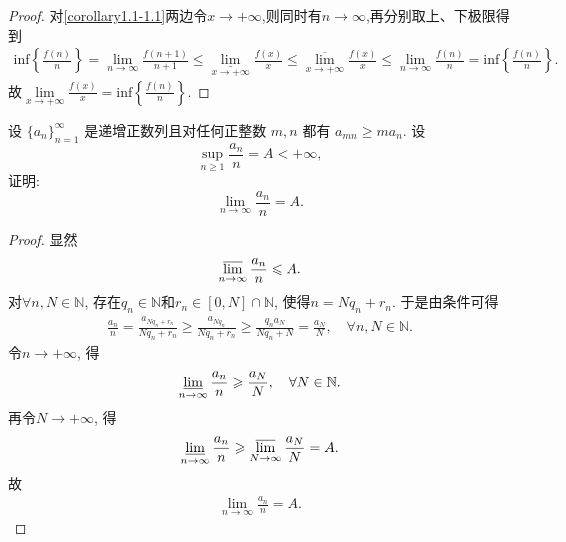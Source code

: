 \documentclass[../../main.tex]{subfiles}%
\begin{document}
\begin{proof}
对\eqref{corollary1.1-1.1}两边令$x\rightarrow +\infty$,则同时有$n\rightarrow \infty$,再分别取上、下极限得到
\begin{align*}
\mathrm{inf}\left\{ \frac{f\left( n \right)}{n} \right\} =\underset{n\rightarrow \infty}{\lim}\frac{f\left( n+1 \right)}{n+1}\leqslant \underset{x\rightarrow +\infty}{\underline{\lim }}\frac{f\left( x \right)}{x}\leqslant \underset{x\rightarrow +\infty}{\overline{\lim }}\frac{f\left( x \right)}{x}\leqslant \underset{n\rightarrow \infty}{\lim}\frac{f\left( n \right)}{n}=\mathrm{inf}\left\{ \frac{f\left( n \right)}{n} \right\}.
\end{align*}
故$\underset{x\rightarrow +\infty}{\lim}\frac{f\left( x \right)}{x}=\mathrm{inf}\left\{ \frac{f\left( n \right)}{n} \right\}$.
\end{proof}

\begin{example}
设 $\{a_n\}_{n=1}^{\infty}$ 是递增正数列且对任何正整数 $m,n$ 都有 $a_{mn} \geqslant ma_n$. 设
\[
\sup_{n\geqslant 1} \frac{a_n}{n} = A < +\infty,
\]
证明:
\[
\lim_{n\to\infty} \frac{a_n}{n} = A.
\]
\end{example}
\begin{proof}
显然
\begin{align*}
\varlimsup\limits_{n\rightarrow \infty}\frac{a_n}{n}\leqslant A.
\end{align*}
对$\forall n,N\in \mathbb{N}$, 存在$q_n\in \mathbb{N}$和$r_n\in \left[ 0,N \right] \cap \mathbb{N}$, 使得$n=Nq_n+r_n$. 于是由条件可得
\begin{align*}
\frac{a_n}{n}=\frac{a_{Nq_n+r_n}}{Nq_n+r_n}\geqslant \frac{a_{Nq_n}}{Nq_n+r_n}\geqslant \frac{q_na_N}{Nq_n+N}=\frac{a_N}{N},\quad \forall n,N\in \mathbb{N}.
\end{align*}
令$n\rightarrow +\infty$, 得
\begin{align*}
\varliminf\limits_{n\rightarrow \infty}\frac{a_n}{n}\geqslant \frac{a_N}{N},\quad \forall N\in \mathbb{N}.
\end{align*}
再令$N\rightarrow +\infty$, 得
\begin{align*}
\varliminf\limits_{n\rightarrow \infty}\frac{a_n}{n}\geqslant \varlimsup\limits_{N\rightarrow \infty}\frac{a_N}{N}=A.
\end{align*}
故
\begin{align*}
\lim\limits_{n\rightarrow \infty}\frac{a_n}{n}=A.
\end{align*}
\end{proof}
\end{document}

